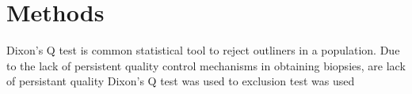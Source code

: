 \chapter{Methods}

Dixon's Q test is common statistical tool to reject outliners in a population. Due to the lack of persistent quality control mechanisms in obtaining biopsies, are lack of persistant quality Dixon's Q test was used to   exclusion test was used 
